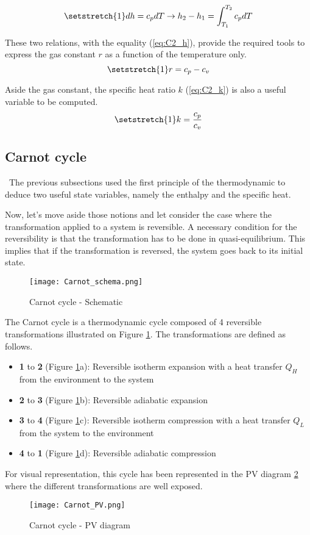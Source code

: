 \begin{equation}
\setstretch{1}
dh = c_pdT \rightarrow h_2 - h_1 = \int_{T_1}^{T_2} c_pdT\label{eq:C2_UP}
\end{equation} 

These two relations, with the equality (\ref{eq:C2_h}), provide the required tools to express the gas constant $r$ as a function of the temperature only. 
\begin{equation}
\setstretch{1}
r = c_p - c_v \label{eq:C2_r}
\end{equation}

Aside the gas constant, the specific heat ratio $k$ (\ref{eq:C2_k}) is also a useful variable to be computed.
\begin{equation}
\setstretch{1}
k = \frac{c_p}{c_v} \label{eq:C2_k}
\end{equation}

\subsection{Carnot cycle}
\quad\, The previous subsections used the first principle of the thermodynamic to deduce two useful state variables, namely the enthalpy and the specific heat.

Now, let's move aside those notions and let consider the case where the transformation applied to a system is reversible. A necessary condition for the reversibility is that the transformation has to be done in quasi-equilibrium. This implies that if the transformation is reversed, the system goes back to its initial state.


\begin{figure}[h]
\centering
\texttt{[image: Carnot\_schema.png]}
\caption{Carnot cycle - Schematic \cite{2015}}
\label{fig:C2_Carnot}
\end{figure}
The Carnot cycle is a thermodynamic cycle composed of 4 reversible transformations illustrated on Figure \ref{fig:C2_Carnot}. The transformations are defined as follows.

\begin{itemize}
\item \textbf{1} to \textbf{2} (Figure \ref{fig:C2_Carnot}a): Reversible isotherm expansion with a heat transfer $Q_H$ from the environment to the system
\item \textbf{2} to \textbf{3} (Figure \ref{fig:C2_Carnot}b): Reversible  adiabatic expansion
\item \textbf{3} to \textbf{4} (Figure \ref{fig:C2_Carnot}c): Reversible isotherm compression with a heat transfer $Q_L$ from the system to the environment
\item \textbf{4} to \textbf{1} (Figure \ref{fig:C2_Carnot}d): Reversible adiabatic compression
\end{itemize}
For visual representation, this cycle has been represented in the PV diagram \ref{fig:C2_CarnotPV} where the different transformations are well exposed.
\begin{figure}[h]
\centering
\texttt{[image: Carnot\_PV.png]}
\caption{Carnot cycle - PV diagram \cite{2015}}
\label{fig:C2_CarnotPV}
\end{figure}

